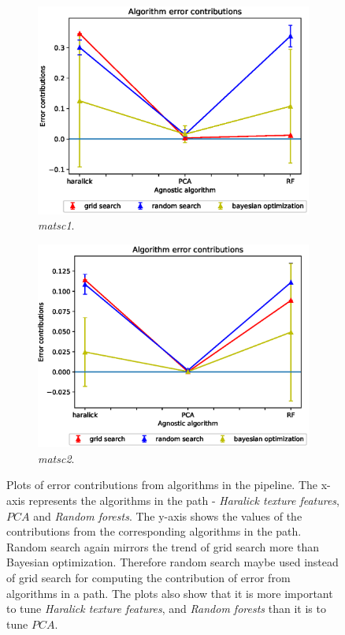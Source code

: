 \begin{figure}[ht!]
\begin{subfigure}{.5\textwidth}
\end{subfigure}
\begin{subfigure}{.5\textwidth}
  \centering
  \includegraphics[scale=0.37]{img/EP/agnostic_error_alg_matsc_dataset1.eps}
  \caption{\textit{matsc1}.}
  \label{fig:eq_alg_matsc1}
\end{subfigure}%
\begin{subfigure}{.5\textwidth}
  \centering
  \includegraphics[scale=0.37]{img/EP/agnostic_error_alg_matsc_dataset2.eps}
  \caption{\textit{matsc2}.}
  \label{fig:eq_alg_matsc2}
\end{subfigure}

\caption{Plots of error contributions from algorithms in the pipeline. The x-axis represents the algorithms in the path - \textit{Haralick texture features}, $PCA$ and \textit{Random forests}. The y-axis shows the values of the contributions from the corresponding algorithms in the path. Random search again mirrors the trend of grid search more than Bayesian optimization. Therefore random search maybe used instead of grid search for computing the contribution of error from algorithms in a path. The plots also show that it is more important to tune \textit{Haralick texture features}, and \textit{Random forests} than it is to tune  $PCA$. }
\label{fig:eq_alg}
\end{figure}
